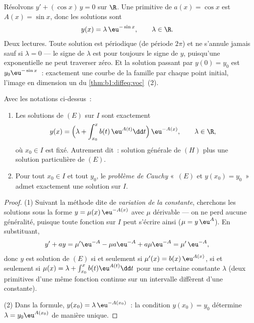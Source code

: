 \begin{example}\label{ex:b1:diffeq:varcoeff}
Résolvons $y' + (\cos x)\,y = 0$ sur $\R$. Une primitive de $a(x) =
\cos x$ est $A(x) = \sin x$, donc les solutions sont
\[
y(x) = \lambda\,\eu^{-\sin x}, \qquad \lambda \in \R .
\]
Deux lectures. Toute solution est périodique (de période $2\pi$) et ne
s'annule jamais sauf si $\lambda = 0$ --- le signe de $\lambda$ est
pour toujours le signe de $y$, puisqu'une exponentielle ne peut
traverser zéro. Et la solution passant par $y(0) = y_0$ est
$y_0\eu^{-\sin x}$~: exactement une courbe de la famille par chaque
point initial, l'image en dimension un du
\cref{thm:b1:diffeq:voc}~(2).
\end{example}

\begin{theorem}\label{thm:b1:diffeq:voc}
Avec les notations ci-dessus~:
\begin{enumerate}
  \item Les solutions de $(E)$ sur $I$ sont exactement
        \[
        y(x) = \Bigl(\lambda + \int_{x_0}^{x} b(t)\, \eu^{A(t)} \dd t
        \Bigr)\, \eu^{-A(x)},
        \qquad \lambda \in \R,
        \]
        où $x_0 \in I$ est fixé. Autrement dit~: solution générale de
        $(H)$ plus une solution particulière de $(E)$.
  \item Pour tout $x_0 \in I$ et tout $y_0$, le \emph{problème de
        Cauchy} «~$(E)$ et $y(x_0) = y_0$~»
        admet exactement une solution sur $I$.
\end{enumerate}
\end{theorem}

\begin{proof}
(1) Suivant la méthode dite de \emph{variation de la
constante}, cherchons les solutions
sous la forme $y = \mu(x)\, \eu^{-A(x)}$ avec $\mu$ dérivable --- on
ne perd aucune généralité, puisque toute fonction sur $I$ peut
s'écrire ainsi ($\mu = y\,\eu^{A}$). En substituant,
\[
y' + ay = \mu' \eu^{-A} - \mu a \eu^{-A} + a\mu\eu^{-A}
= \mu'\, \eu^{-A},
\]
donc $y$ est solution de $(E)$ si et seulement si $\mu'(x) =
b(x)\,\eu^{A(x)}$, si et seulement si $\mu(x) = \lambda + \int_{x_0}^x
b(t)\eu^{A(t)}\dd t$ pour une certaine constante $\lambda$ (deux
primitives d'une même fonction continue sur un intervalle diffèrent
d'une constante).

(2) Dans la formule, $y(x_0) = \lambda\,\eu^{-A(x_0)}$~: la condition
$y(x_0) = y_0$ détermine $\lambda = y_0 \eu^{A(x_0)}$ de manière
unique.
\end{proof}

